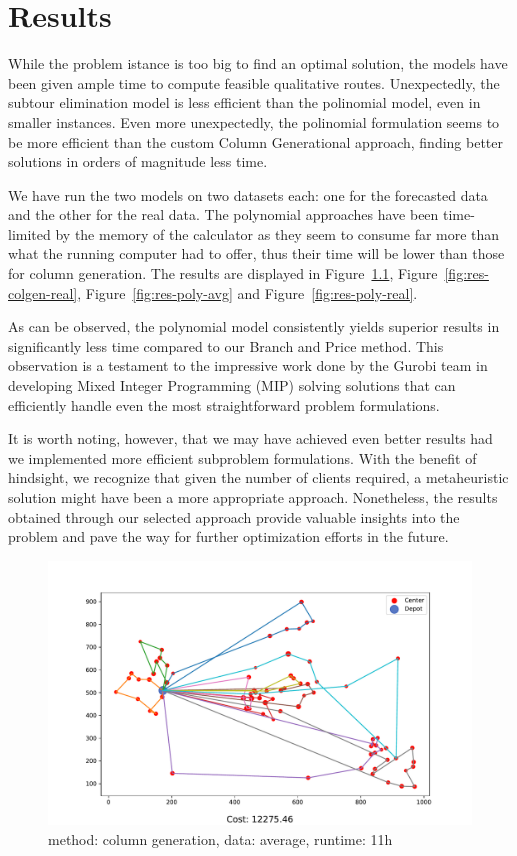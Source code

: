 \chapter{Results}
\label{results}
While the problem istance is too big to find an optimal solution, the models have been given ample time to compute feasible qualitative routes. Unexpectedly, the subtour elimination model is less efficient than the polinomial model, even in smaller instances. Even more unexpectedly, the polinomial formulation seems to be more efficient than the custom Column Generational approach, finding better solutions in orders of magnitude less time.

We have run the two models on two datasets each: one for the forecasted data and the other for the real data.
The polynomial approaches have been time-limited by the memory of the calculator as they seem to consume far more than what the running computer had to offer, thus their time will be lower than those for column generation.
The results are displayed in Figure~\ref{fig:res-colgen-avg}, Figure~\ref{fig:res-colgen-real}, Figure~\ref{fig:res-poly-avg} and Figure~\ref{fig:res-poly-real}.


As can be observed, the polynomial model consistently yields superior results in significantly less time compared to our Branch and Price method. This observation is a testament to the impressive work done by the Gurobi team in developing Mixed Integer Programming (MIP) solving solutions that can efficiently handle even the most straightforward problem formulations.

It is worth noting, however, that we may have achieved even better results had we implemented more efficient subproblem formulations. With the benefit of hindsight, we recognize that given the number of clients required, a metaheuristic solution might have been a more appropriate approach. Nonetheless, the results obtained through our selected approach provide valuable insights into the problem and pave the way for further optimization efforts in the future.


\begin{figure}[tb]
    \centering
    \includegraphics[width=1\columnwidth]{figures/results_colgen_avg.pdf}
    \caption{method: column generation, data: average, runtime: 11h}
  \label{fig:res-colgen-avg}
\end{figure}

